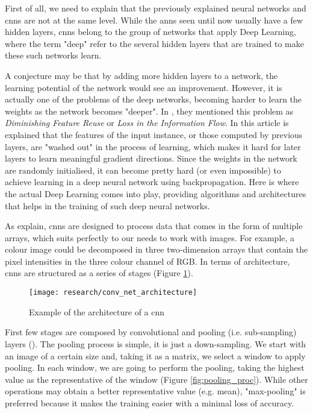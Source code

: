 First of all, we need to explain that the previously explained neural networks and \glspl{cnn} are not at the same level. While the \glspl{ann} seen until now usually have a few hidden layers, \glspl{cnn} belong to the group of networks that apply Deep Learning, where the term "deep" refer to the several hidden layers that are trained to make these such networks learn.

A conjecture may be that by adding more hidden layers to a network, the learning potential of the network would see an improvement. However, it is actually one of the problems of the deep networks, becoming harder to learn the weights as the network becomes "deeper". In \cite{huang2016deep}, they mentioned this problem as \textit{Diminishing Feature Reuse} or \textit{Loss in the Information Flow}. In this article is explained that the features of the input instance, or those computed by previous layers, are "washed out" in the process of learning, which makes it hard for later layers to learn meaningful gradient directions. Since the weights in the network are randomly initialised, it can become pretty hard (or even impossible) to achieve learning in a deep neural network using backpropagation. Here is where the actual Deep Learning comes into play, providing algorithms and architectures that helps in the training of such deep neural networks. 

As \cite{lecun2015deep} explain, \glspl{cnn} are designed to process data that comes in the form of multiple arrays, which suits perfectly to our needs to work with images. For example, a colour image could be decomposed in three two-dimension arrays that contain the pixel intensities in the three colour channel of RGB. In terms of architecture, \glspl{cnn} are structured as a series of stages (Figure \ref{fig:conv_net_architecture}). 

\begin{figure}[!ht]
	\centering
	\vspace{0.3cm}
	\texttt{[image: research/conv\_net\_architecture]}
	\caption{Example of the architecture of a \gls{cnn} \cite{haykin2009neural}}
	\label{fig:conv_net_architecture}
\end{figure}

First few stages are composed by convolutional and pooling (i.e. sub-sampling) layers (\cite{lecun2015deep}). The pooling process is simple, it is just a down-sampling. We start with an image of a certain size and, taking it as a matrix, we select a window to apply pooling. In each window, we are going to perform the pooling, taking the highest value as the representative of the window (Figure \ref{fig:pooling_proc}). While other operations may obtain a better representative value (e.g. mean), "max-pooling" is preferred because it makes the training easier with a minimal loss of accuracy.

